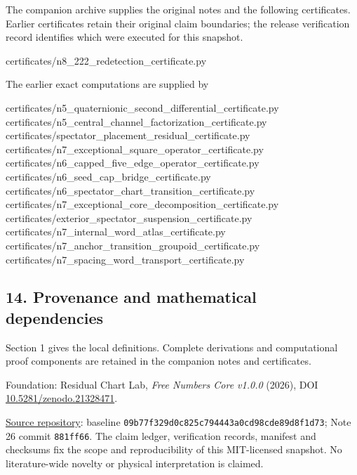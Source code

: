 \documentclass[
  11pt,
  a4paper,
]{article}
\newenvironment{Shaded}{}{}
\newcommand{\NormalTok}[1]{#1}
\begin{document}
The companion archive supplies the original notes and the following
certificates. Earlier certificates retain their original claim
boundaries; the release verification record identifies which were
executed for this snapshot.

\begin{Shaded}
\begin{Highlighting}[]
\NormalTok{certificates/n8\_222\_redetection\_certificate.py}
\end{Highlighting}
\end{Shaded}

The earlier exact computations are supplied by

\begin{Shaded}
\begin{Highlighting}[]
\NormalTok{certificates/n5\_quaternionic\_second\_differential\_certificate.py}
\NormalTok{certificates/n5\_central\_channel\_factorization\_certificate.py}
\NormalTok{certificates/spectator\_placement\_residual\_certificate.py}
\NormalTok{certificates/n7\_exceptional\_square\_operator\_certificate.py}
\NormalTok{certificates/n6\_capped\_five\_edge\_operator\_certificate.py}
\NormalTok{certificates/n6\_seed\_cap\_bridge\_certificate.py}
\NormalTok{certificates/n6\_spectator\_chart\_transition\_certificate.py}
\NormalTok{certificates/n7\_exceptional\_core\_decomposition\_certificate.py}
\NormalTok{certificates/exterior\_spectator\_suspension\_certificate.py}
\NormalTok{certificates/n7\_internal\_word\_atlas\_certificate.py}
\NormalTok{certificates/n7\_anchor\_transition\_groupoid\_certificate.py}
\NormalTok{certificates/n7\_spacing\_word\_transport\_certificate.py}
\end{Highlighting}
\end{Shaded}

\hypertarget{provenance-and-mathematical-dependencies}{%
\subsection{14. Provenance and mathematical
dependencies}\label{provenance-and-mathematical-dependencies}}

Section 1 gives the local definitions. Complete derivations and
computational proof components are retained in the companion notes and
certificates.

Foundation: Residual Chart Lab, \emph{Free Numbers Core v1.0.0} (2026),
DOI
\href{https://doi.org/10.5281/zenodo.21328471}{10.5281/zenodo.21328471}.

\href{https://github.com/residual-chart-lab/free-number-core}{Source
repository}: baseline \texttt{09b77f329d0c825c794443a0cd98cde89d8f1d73};
Note 26 commit \texttt{881ff66}. The claim ledger, verification records,
manifest and checksums fix the scope and reproducibility of this
MIT-licensed snapshot. No literature-wide novelty or physical
interpretation is claimed.
\end{document}
